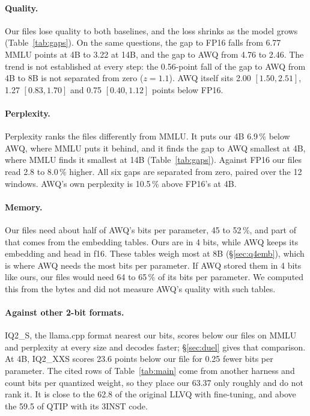 \paragraph{Quality.} Our files lose quality to both baselines, and the loss
shrinks as the model grows (Table~\ref{tab:gaps}). On the same questions, the
gap to FP16 falls from 6.77 MMLU points at 4B to 3.22 at 14B, and the gap to
AWQ from 4.76 to 2.46. The trend is not established at every step: the
0.56-point fall of the gap to AWQ from 4B to 8B is not separated from zero
($z=1.1$). AWQ itself sits 2.00 $[1.50, 2.51]$, 1.27 $[0.83, 1.70]$ and 0.75
$[0.40, 1.12]$ points below FP16.

\paragraph{Perplexity.} Perplexity ranks the files differently from MMLU. It
puts our 4B 6.9\,\% below AWQ, where MMLU puts it behind, and it finds the gap
to AWQ smallest at 4B, where MMLU finds it smallest at 14B
(Table~\ref{tab:gaps}). Against FP16 our files read 2.8 to 8.0\,\% higher. All
six gaps are separated from zero, paired over the 12 windows. AWQ's own
perplexity is 10.5\,\% above FP16's at 4B.

\paragraph{Memory.} Our files need about half of AWQ's bits per parameter, 45
to 52\,\%, and part of that comes from the embedding tables. Ours are in 4
bits, while AWQ keeps its embedding and head in f16. These tables weigh most
at 8B (\S\ref{sec:q4emb}), which is where AWQ needs the most bits per
parameter. If AWQ stored them in 4 bits like ours, our files would need 64 to
65\,\% of its bits per parameter. We computed this from the bytes and did not
measure AWQ's quality with such tables.

\paragraph{Against other 2-bit formats.} IQ2\_S, the llama.cpp format nearest
our bits, scores below our files on MMLU and perplexity at every size and
decodes faster; \S\ref{sec:duel} gives that comparison. At 4B, IQ2\_XXS scores
23.6 points below our file for 0.25 fewer bits per parameter. The cited rows
of Table~\ref{tab:main} come from another harness and count bits per quantized
weight, so they place our 63.37 only roughly and do not rank it. It is close
to the 62.8 of the original LLVQ with fine-tuning, and above the 59.5 of QTIP
with its 3INST code.

